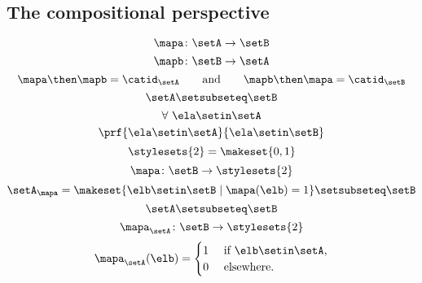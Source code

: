 \begin{forslides}
\subsection{The compositional perspective}

\begin{equation}\label{eq:slides_session2_183}
\mapa\colon \setA \to \setB
\end{equation}
\begin{equation}\label{eq:slides_session2_184}
\mapb \colon \setB \to \setA
\end{equation}
\begin{equation}\label{eq:slides_session2_185}
\mapa \then \mapb = \catid_\setA \qquad \text{and}  \qquad \mapb \then \mapa = \catid_\setB
\end{equation}
\begin{equation}\label{eq:slides_session2_186}
\setA \setsubseteq \setB
\end{equation}
\begin{equation}\label{eq:slides_session2_187}
\forall \ \ela \setin\setA
\end{equation}
\begin{equation}\label{eq:slides_session2_188}
 \prf{
        \ela \setin\setA
    }{
        \ela \setin\setB
    }
\end{equation}
\begin{equation}\label{eq:slides_session2_189}
\stylesets{2} = \makeset{ 0, 1}
\end{equation}
\begin{equation}\label{eq:slides_session2_190}
\mapa \colon \setB \to \stylesets{2}
\end{equation}
\begin{equation}\label{eq:slides_session2_191}
\setA_\mapa = \makeset{ \elb \setin\setB \mid \mapa(\elb) = 1 } \setsubseteq \setB
\end{equation}
\begin{equation}\label{eq:slides_session2_192}
\setA \setsubseteq \setB
\end{equation}
\begin{equation}\label{eq:slides_session2_193}
\mapa_\setA \colon \setB \to \stylesets{2}
\end{equation}
\begin{equation}\label{eq:slides_session2_194}
\mapa_\setA(\elb) = \begin{cases}
        1 & \text{ if }\elb\setin\setA, \\
        0 & \text{ elsewhere}.
    \end{cases}

\end{equation}
\end{forslides}
